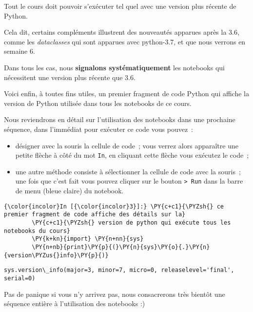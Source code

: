     Tout le cours doit pouvoir s'exécuter tel quel avec une version plus
récente de Python.

Cela dit, certains compléments illustrent des nouveautés apparues après
la 3.6, comme les \emph{dataclasses} qui sont apparues avec python-3.7,
et que nous verrons en semaine 6.

Dans tous les cas, nous \textbf{signalons systématiquement} les
notebooks qui nécessitent une version plus récente que 3.6.

    Voici enfin, à toutes fins utiles, un premier fragment de code Python
qui affiche la version de Python utilisée dans tous les notebooks de ce
cours.

Nous reviendrons en détail sur l'utilisation des notebooks dans une
prochaine séquence, dans l'immédiat pour exécuter ce code vous pouvez~:

\begin{itemize}
\tightlist
\item
  désigner avec la souris la cellule de code~; vous verrez alors
  apparaître une petite flèche à côté du mot \texttt{In}, en cliquant
  cette flèche vous exécutez le code~;
\item
  une autre méthode consiste à sélectionner la cellule de code avec la
  souris~; une fois que c'est fait vous pouvez cliquer sur le bouton
  \texttt{\textgreater{}\textbar{}\ Run} dans la barre de menu (bleue
  claire) du notebook.
\end{itemize}

    \begin{Verbatim}[commandchars=\\\{\}]
{\color{incolor}In [{\color{incolor}3}]:} \PY{c+c1}{\PYZsh{} ce premier fragment de code affiche des détails sur la}
        \PY{c+c1}{\PYZsh{} version de python qui exécute tous les notebooks du cours}
        \PY{k+kn}{import} \PY{n+nn}{sys}
        \PY{n+nb}{print}\PY{p}{(}\PY{n}{sys}\PY{o}{.}\PY{n}{version\PYZus{}info}\PY{p}{)}
\end{Verbatim}


    \begin{Verbatim}[commandchars=\\\{\}]
sys.version\_info(major=3, minor=7, micro=0, releaselevel='final', serial=0)

    \end{Verbatim}

    Pas de panique si vous n'y arrivez pas, nous consacrerons très bientôt
une séquence entière à l'utilisation des notebooks :)


    
    
    
